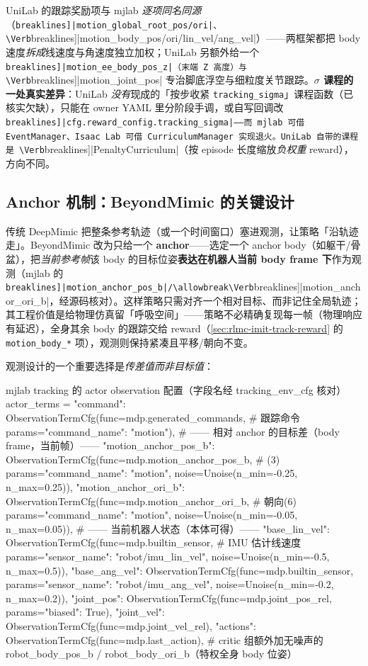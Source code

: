 UniLab 的跟踪奖励项与 mjlab \emph{逐项同名同源}（\Verb[breaklines]|motion_global_root_pos/ori|、\Verb[breaklines]|motion_body_pos/ori/lin_vel/ang_vel|）——两框架都把 body 速度\emph{拆成}线速度与角速度独立加权；UniLab 另额外给一个 \Verb[breaklines]|motion_ee_body_pos_z|（末端 Z 高度）与 \Verb[breaklines]|motion_joint_pos| 专治脚底浮空与细粒度关节跟踪。\textbf{$\sigma$ 课程的一处真实差异}：UniLab \emph{没有}现成的「按步收紧 \texttt{tracking\_sigma}」课程函数（已核实欠缺），只能在 owner YAML 里分阶段手调，或自写回调改 \Verb[breaklines]|cfg.reward_config.tracking_sigma|——而 mjlab 可借 EventManager、Isaac Lab 可借 CurriculumManager 实现退火。UniLab 自带的课程是 \Verb[breaklines]|PenaltyCurriculum|（按 episode 长度缩放\emph{负权重} reward），方向不同。

\subsection{Anchor 机制：BeyondMimic 的关键设计}
\label{sec:rlmc-imit-track-anchor}

传统 DeepMimic 把整条参考轨迹（或一个时间窗口）塞进观测，让策略「沿轨迹走」。BeyondMimic 改为只给一个 \textbf{anchor}——选定一个 anchor body（如躯干/骨盆），把\emph{当前参考帧}该 body 的目标位姿\textbf{表达在机器人当前 body frame 下}作为观测（mjlab 的 \Verb[breaklines]|motion_anchor_pos_b|/\allowbreak\Verb[breaklines]|motion_anchor_ori_b|，经源码核对）。这样策略只需对齐一个相对目标、而非记住全局轨迹；其工程价值是给物理仿真留「呼吸空间」——策略不必精确复现每一帧（物理响应有延迟），全身其余 body 的跟踪交给 reward（\cref{sec:rlmc-imit-track-reward} 的 \verb|motion_body_*| 项），观测则保持紧凑且平移/朝向不变。

观测设计的一个重要选择是\emph{传差值而非目标值}：

\begin{codebox}[Python]{mjlab tracking 的 actor observation 配置（字段名经 tracking\_env\_cfg 核对）}
actor_terms = {
    "command":   ObservationTermCfg(func=mdp.generated_commands,  # 跟踪命令
                                    params={"command_name": "motion"}),
    # —— 相对 anchor 的目标差（body frame，当前帧）——
    "motion_anchor_pos_b": ObservationTermCfg(func=mdp.motion_anchor_pos_b,   # (3)
        params={"command_name": "motion"}, noise=Unoise(n_min=-0.25, n_max=0.25)),
    "motion_anchor_ori_b": ObservationTermCfg(func=mdp.motion_anchor_ori_b,   # 朝向(6)
        params={"command_name": "motion"}, noise=Unoise(n_min=-0.05, n_max=0.05)),
    # —— 当前机器人状态（本体可得）——
    "base_lin_vel": ObservationTermCfg(func=mdp.builtin_sensor,   # IMU 估计线速度
        params={"sensor_name": "robot/imu_lin_vel"}, noise=Unoise(n_min=-0.5, n_max=0.5)),
    "base_ang_vel": ObservationTermCfg(func=mdp.builtin_sensor,
        params={"sensor_name": "robot/imu_ang_vel"}, noise=Unoise(n_min=-0.2, n_max=0.2)),
    "joint_pos": ObservationTermCfg(func=mdp.joint_pos_rel, params={"biased": True}),
    "joint_vel": ObservationTermCfg(func=mdp.joint_vel_rel),
    "actions":   ObservationTermCfg(func=mdp.last_action),
}
# critic 组额外加无噪声的 robot_body_pos_b / robot_body_ori_b（特权全身 body 位姿）
\end{codebox}

